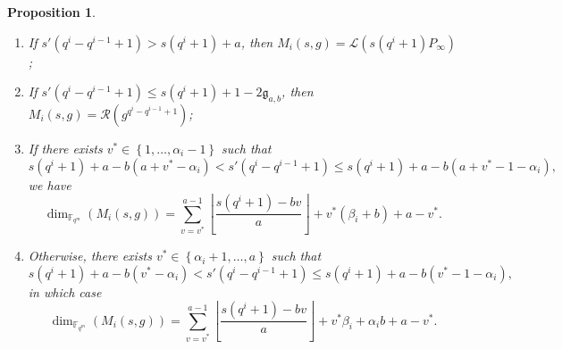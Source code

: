 \documentclass[lettersize,journal]{IEEEtran}
\theoremstyle{plain}
\newtheorem{proposition}[thm]{Proposition}
\theoremstyle{definition}
\theoremstyle{remark}
\newcommand{\calL}{\mathcal{L}}
\newcommand{\calR}{\mathcal{R}}
\newcommand{\fqm}{\mathbb{F}_{q^m}}
\newcommand{\set}[1]{\left\{#1\right\}}
\begin{document}
	\begin{proposition} \label{prop:dim_M_i's}
		\begin{enumerate}
			\item If $s'(q^i-q^{i-1}+1) > s(q^i+1)+a$, then $M_i(s,g) = \calL(s(q^i+1)P_\infty)$;
			
			\item If $s'(q^i-q^{i-1}+1) \leq s(q^i+1)+1-2\mathfrak{g}_{a,b}$, then $M_i(s,g) = \calR(g^{q^{i}-q^{i-1}+1})$;
			
			\item If there exists $v^* \in \set{1,\dots,\alpha_i-1}$ such that
			$$ s(q^i+1)+a-b(a+v^*-\alpha_i) < s'(q^i-q^{i-1}+1) \leq  s(q^i+1)+a-b(a+v^*-1-\alpha_i),$$
			we have 
			$$\dim_{\fqm}(M_i(s,g)) = \sum\limits_{v=v^*}^{a-1} \left\lfloor \dfrac{s(q^i+1)-bv}{a} \right\rfloor + v^*(\beta_i+b) + a-v^*.$$
			
			\item Otherwise, there exists $v^* \in \set{\alpha_i+1,\dots,a}$ such that
			$$ s(q^i+1)+a-b(v^*-\alpha_i) < s'(q^i-q^{i-1}+1) \leq  s(q^i+1)+a-b(v^*-1-\alpha_i),$$
			in which case 
			$$\dim_{\fqm}(M_i(s,g)) = \sum\limits_{v=v^*}^{a-1} \left\lfloor \dfrac{s(q^i+1)-bv}{a} \right\rfloor + v^*\beta_i + \alpha_ib +a-v^*.$$
		\end{enumerate}
	\end{proposition}
	
\end{document}
